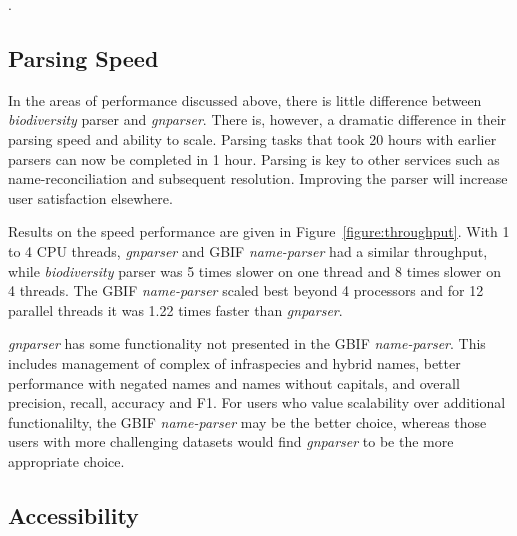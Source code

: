 \documentclass{bmcart}
\begin{document}


\cite{gnparser-json}.

\subsection*{Parsing Speed}

In the areas of performance discussed above, there is little difference
between \textit{biodiversity} parser and \textit{gnparser}. There is, however,
a dramatic difference in their parsing speed and ability to scale. Parsing tasks that took 20 hours with earlier parsers can now be completed in 1 hour. Parsing is key to other services
such as name-reconciliation and subsequent resolution. Improving the parser will increase user
satisfaction elsewhere.

Results on the speed performance are given in Figure~\ref{figure:throughput}.
With 1 to 4 CPU threads, \textit{gnparser} and GBIF \textit{name-parser} had a
similar throughput, while \textit{biodiversity} parser was 5 times slower on
one thread and 8 times slower on 4 threads. The GBIF \textit{name-parser}
scaled best beyond 4 processors and for 12 parallel threads it was 1.22 times
faster than \textit{gnparser}.  

\textit{gnparser} has some functionality not presented in the GBIF
\textit{name-parser}. This includes management of complex of infraspecies and
hybrid names, better performance with negated names and names without capitals,
and overall precision, recall, accuracy and F1.  For users who value
scalability over additional functionalilty, the GBIF \textit{name-parser} may be
the better choice, whereas those users with more challenging datasets would find \textit{gnparser} to be the more appropriate choice.

\subsection*{Accessibility}
\end{document}
